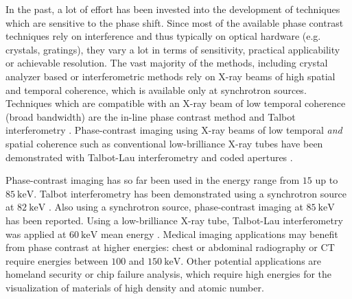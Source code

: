 \documentclass[aip,apl,amsmath,amssymb,floatfix,reprint,a4paper]{revtex4-1}
\begin{document}
In the past, a lot of effort has been invested into the development of
techniques which are sensitive to the phase shift. Since most of the
available phase contrast techniques rely on interference and thus typically
on optical hardware (e.g. crystals, gratings), they vary a lot in terms of
sensitivity, practical applicability or achievable resolution. The vast
majority of the methods, including crystal analyzer based
\cite{Davis1995,Chapman1997} or interferometric \cite{Bonse1965,Momose1996}
methods rely on X-ray beams of high spatial and temporal coherence, which is
available only at synchrotron sources. Techniques which are compatible with
an X-ray beam of low temporal coherence (broad bandwidth) are the in-line
phase contrast method \cite{Snigirev1995,Wilkins1996,Cloetens1996} and
Talbot interferometry \cite{Cloetens1997,David2002,Momose2003a}.
Phase-contrast imaging using X-ray beams of low temporal \emph{and}
spatial coherence such as conventional low-brilliance X-ray tubes have been
demonstrated with Talbot-Lau interferometry \cite{Pfeiffer2006} and coded
apertures \cite{Munro2012}.

Phase-contrast imaging has so far been used in the energy
range from $15$ up to $\SI{85}{\kilo\electronvolt}$. Talbot
interferometry has been demonstrated using a synchrotron source at
$\SI{82}{\kilo\electronvolt}$ \cite{Willner2013}. Also using a synchrotron
source, phase-contrast imaging at $\SI{85}{\kilo\electronvolt}$ has been
reported. Using a low-brilliance X-ray tube, Talbot-Lau interferometry was
applied at $\SI{60}{\kilo\electronvolt}$ mean energy \cite{Donath2009}.
Medical imaging applications may benefit from phase contrast at higher
energies: chest or abdominal
radiography or \ac{CT} require energies between $100$ and
$\SI{150}{\kilo\electronvolt}$. Other potential applications are homeland
security or chip failure analysis, which require high energies for the
visualization of materials of high density and atomic number.
\end{document}

